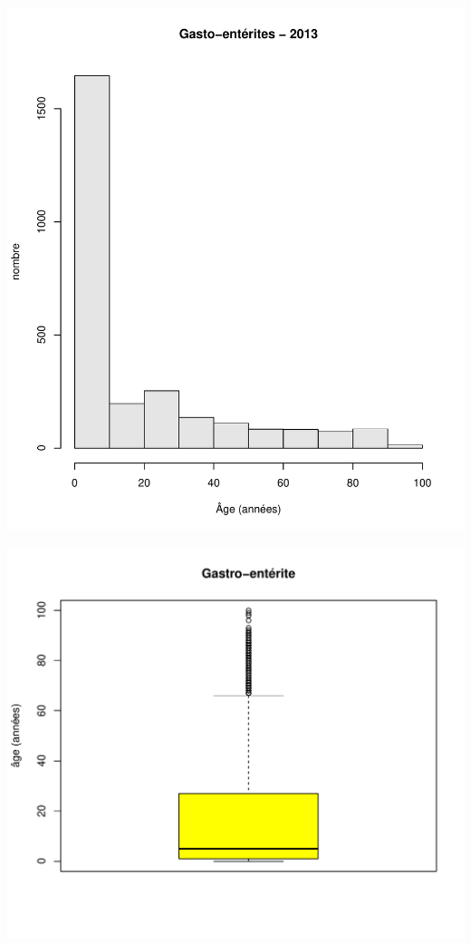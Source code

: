 \documentclass[12pt,english,french,twoside]{book}\usepackage[]{graphicx}\usepackage[]{color}
\makeatletter
\def\maxwidth{ %
  \ifdim\Gin@nat@width>\linewidth
    \linewidth
  \else
    \Gin@nat@width
  \fi
}
\newenvironment{knitrout}{}{} %
\makeatother
\begin{document}
\begin{knitrout}
\color{fgcolor}

{\centering \includegraphics[width=\maxwidth]{figure/ge_hist-1} 

}



\end{knitrout}

\begin{knitrout}
\color{fgcolor}

{\centering \includegraphics[width=\maxwidth]{figure/ge_age_box-1} 

}



\end{knitrout}
\end{document}
